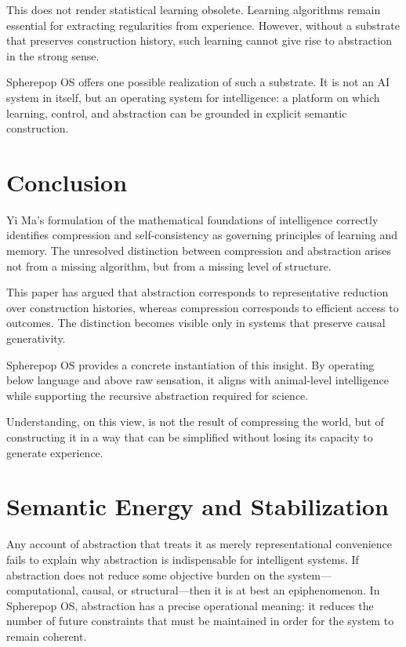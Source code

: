 \documentclass[11pt]{article}
\begin{document}
This does not render statistical learning obsolete. Learning algorithms
remain essential for extracting regularities from experience. However,
without a substrate that preserves construction history, such learning
cannot give rise to abstraction in the strong sense.

Spherepop OS offers one possible realization of such a substrate. It is
not an AI system in itself, but an operating system for intelligence: a
platform on which learning, control, and abstraction can be grounded in
explicit semantic construction.

\section{Conclusion}

Yi Ma’s formulation of the mathematical foundations of intelligence
correctly identifies compression and self-consistency as governing
principles of learning and memory. The unresolved distinction between
compression and abstraction arises not from a missing algorithm, but from a
missing level of structure.

This paper has argued that abstraction corresponds to representative
reduction over construction histories, whereas compression corresponds to
efficient access to outcomes. The distinction becomes visible only in
systems that preserve causal generativity.

Spherepop OS provides a concrete instantiation of this insight. By
operating below language and above raw sensation, it aligns with
animal-level intelligence while supporting the recursive abstraction
required for science.

Understanding, on this view, is not the result of compressing the world,
but of constructing it in a way that can be simplified without losing its
capacity to generate experience.

\section{Semantic Energy and Stabilization}

Any account of abstraction that treats it as merely representational
convenience fails to explain why abstraction is indispensable for
intelligent systems. If abstraction does not reduce some objective burden
on the system—computational, causal, or structural—then it is at best an
epiphenomenon. In Spherepop OS, abstraction has a precise operational
meaning: it reduces the number of future constraints that must be
maintained in order for the system to remain coherent.
\end{document}
